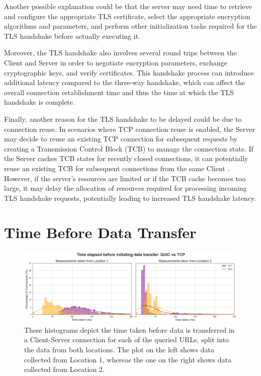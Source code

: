\documentclass{l4proj}
\begin{document}
Another possible explanation could be that the server may need time to retrieve and configure the appropriate TLS certificate, select the appropriate encryption algorithms and parameters, and perform other initialization tasks required for the TLS handshake before actually executing it. 

Moreover, the TLS handshake also involves several round trips between the Client and Server in order to negotiate encryption parameters, exchange cryptographic keys, and verify certificates. This handshake process can introduce additional latency compared to the three-way handshake, which can affect the overall connection establishment time and thus the time at which the TLS handshake is complete.

Finally, another reason for the TLS handshake to be delayed could be due to connection reuse. In scenarios where TCP connection reuse is enabled, the Server may decide to reuse an existing TCP connection for subsequent requests by creating a Transmission Control Block (TCB) to manage the connection state. If the Server caches TCB states for recently closed connections, it can potentially reuse an existing TCB for subsequent connections from the same Client \citep{Egge2000}. However, if the server's resources are limited or if the TCB cache becomes too large, it may delay the allocation of resources required for processing incoming TLS handshake requests, potentially leading to increased TLS handshake latency.

\section{Time Before Data Transfer}

\begin{figure}
    \centering
    \includegraphics[width=1\linewidth]{images/time_to_data_transfer.png}
    \caption{These histograms depict the time taken before data is transferred in a Client-Server connection for each of the queried URLs, split into the data from both locations. The plot on the left shows data collected from Location 1, whereas the one on the right shows data collected from Location 2.}
    \label{fig:timeBeforeDataTransfer}
\end{figure}
\end{document}
